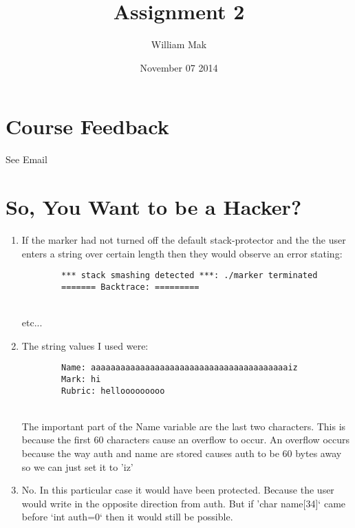 \documentclass{article}
\title{Assignment 2}
\author{William Mak}
\date{November 07 2014}
\begin{document}
\maketitle

\section{Course Feedback}
See Email

\section{So, You Want to be a Hacker?}
\begin{enumerate}[A]
	\item
		If the marker had not turned off the default stack-protector and the the
		user enters a string over certain length then they would observe an
		error stating:
		\begin{verbatim}
		*** stack smashing detected ***: ./marker terminated
		======= Backtrace: =========
		\end{verbatim}\\
		etc...
	\item
		The string values I used were:
		\begin{verbatim}
		Name: aaaaaaaaaaaaaaaaaaaaaaaaaaaaaaaaaaaaaaaaiz
		Mark: hi
		Rubric: hellooooooooo
		\end{verbatim}\\
		The important part of the Name variable are the last two characters.
		This is because the first 60 characters cause an overflow to occur. An
		overflow occurs because the way auth and name are stored causes auth to 
		be 60 bytes away so we can just set it to 'iz'
	\item
		No. In this particular case it would have been protected. Because the
		user would write in the opposite direction from auth. But if 
		'char name[34]` came before `int auth=0` then it would still be 
		possible.
\end{enumerate}
\end{document}
